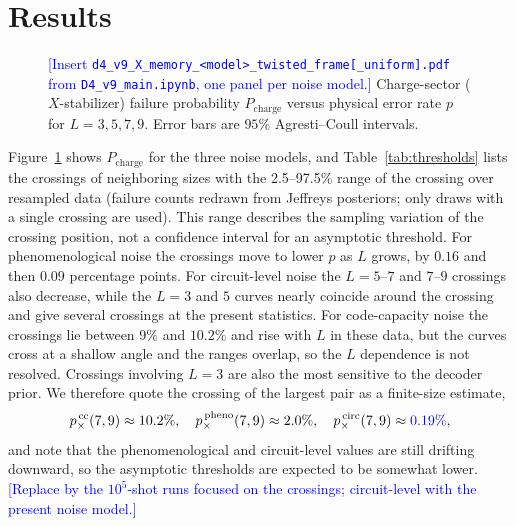 \documentclass[a4paper]{article}
\newcommand{\blue}[1]{\textcolor{blue}{#1}}
\begin{document}
\section{Results}
\label{sec:results}

\begin{figure}[t]
  \centering
  \fbox{\rule{0pt}{50mm}\rule{0.82\linewidth}{0pt}}
  \caption{\blue{[Insert \texttt{d4\_v9\_X\_memory\_<model>\_twisted\_frame[\_uniform].pdf} from \texttt{D4\_v9\_main.ipynb}, one panel per noise model.]} Charge-sector ($X$-stabilizer) failure probability $P_{\mathrm{charge}}$ versus physical error rate $p$ for $L=3,5,7,9$. Error bars are $95\%$ Agresti--Coull intervals.}
  \label{fig:threshold}
\end{figure}

Figure~\ref{fig:threshold} shows $P_{\mathrm{charge}}$ for the three noise models, and Table~\ref{tab:thresholds} lists the crossings of neighboring sizes with the 2.5--97.5\% range of the crossing over resampled data (failure counts redrawn from Jeffreys posteriors; only draws with a single crossing are used). This range describes the sampling variation of the crossing position, not a confidence interval for an asymptotic threshold. For phenomenological noise the crossings move to lower $p$ as $L$ grows, by $0.16$ and then $0.09$ percentage points. For circuit-level noise the $L=5$--$7$ and $7$--$9$ crossings also decrease, while the $L=3$ and $5$ curves nearly coincide around the crossing and give several crossings at the present statistics. For code-capacity noise the crossings lie between $9\%$ and $10.2\%$ and rise with $L$ in these data, but the curves cross at a shallow angle and the ranges overlap, so the $L$ dependence is not resolved. Crossings involving $L=3$ are also the most sensitive to the decoder prior. We therefore quote the crossing of the largest pair as a finite-size estimate,
\begin{equation}
  p_\times^{\,\mathrm{cc}}(7,9)\approx10.2\%,\quad
  p_\times^{\,\mathrm{pheno}}(7,9)\approx2.0\%,\quad
  p_\times^{\,\mathrm{circ}}(7,9)\approx\blue{0.19\%},
\end{equation}
and note that the phenomenological and circuit-level values are still drifting downward, so the asymptotic thresholds are expected to be somewhat lower. \blue{[Replace by the $10^5$-shot runs focused on the crossings; circuit-level with the present noise model.]}
\end{document}
